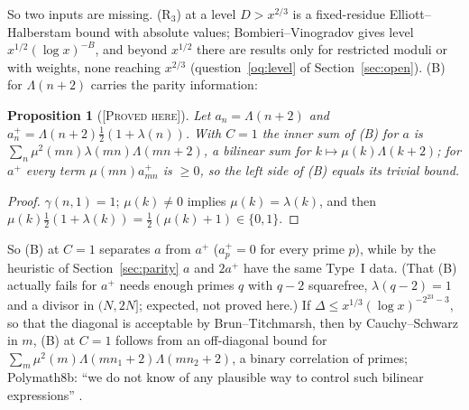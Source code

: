 \documentclass[11pt]{amsart}
\newtheorem{proposition}[theorem]{Proposition}
\theoremstyle{definition}
\theoremstyle{remark}
\newcommand{\lbl}[1]{\textup{\textsc{[#1]}}}
\begin{document}
So two inputs are missing. (R$_3$) at a level $D>x^{2/3}$ is a fixed-residue
Elliott--Halberstam bound with absolute values; Bombieri--Vinogradov gives
level $x^{1/2}(\log x)^{-B}$, and beyond $x^{1/2}$ there are results only for
restricted moduli or with weights, none reaching $x^{2/3}$ (question~\ref{oq:level} of Section~\ref{sec:open}). (B) for $\Lambda(n+2)$ carries the parity
information:

\begin{proposition}[\lbl{Proved here}]\label{prop:B-parity}
Let $a_n=\Lambda(n+2)$ and $a^{+}_n=\Lambda(n+2)\tfrac12(1+\lambda(n))$. With
$C=1$ the inner sum of \textup{(B)} for $a$ is
$\sum_n\mu^2(mn)\lambda(mn)\Lambda(mn+2)$, a bilinear sum for
$k\mapsto\mu(k)\Lambda(k+2)$; for $a^+$ every term $\mu(mn)a^+_{mn}$ is
$\ge0$, so the left side of \textup{(B)} equals its trivial bound.
\end{proposition}

\begin{proof}
$\gamma(n,1)=1$; $\mu(k)\ne0$ implies $\mu(k)=\lambda(k)$, and then
$\mu(k)\tfrac12(1+\lambda(k))=\tfrac12(\mu(k)+1)\in\{0,1\}$.
\end{proof}

So (B) at $C=1$ separates $a$ from $a^+$ ($a^+_p=0$ for every prime $p$), while by the
heuristic of Section~\ref{sec:parity} $a$ and $2a^+$ have the same Type~I data.
(That (B) actually fails for $a^+$ needs enough primes $q$ with $q-2$
squarefree, $\lambda(q-2)=1$ and a divisor in $(N,2N]$; expected, not proved
here.) If $\Delta\le x^{1/3}(\log x)^{-2^{23}-3}$, so that the diagonal is
acceptable by Brun--Titchmarsh, then by Cauchy--Schwarz in $m$, (B) at $C=1$
follows from an off-diagonal bound for
$\sum_m\mu^2(m)\Lambda(mn_1+2)\Lambda(mn_2+2)$, a binary correlation of
primes; Polymath8b: ``we do not know of any plausible way to control such
bilinear expressions'' \cite[p.~71]{PM8b}.
\end{document}
